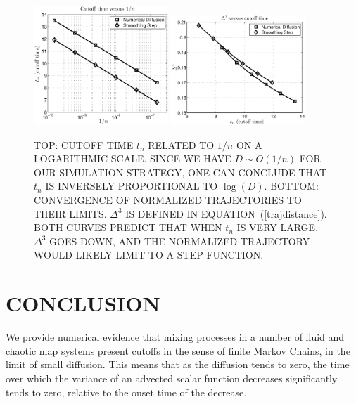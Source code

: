 \documentclass[twocolumn,10pt]{asme2e}
\begin{document}
\begin{figure}
   \label{cutofftime}
      \includegraphics[width=0.45\textwidth]{cutofftimevsD}
      \includegraphics[width=0.45\textwidth]{areavscutofftime}
     \caption{\label{cutofftimeandarea} TOP: CUTOFF TIME $t_n$ RELATED
       TO $1/n$ ON A LOGARITHMIC SCALE. SINCE WE HAVE $D \sim O(1/n)$
       FOR OUR SIMULATION STRATEGY, ONE CAN CONCLUDE THAT $t_n$ IS
       INVERSELY PROPORTIONAL TO $\log(D)$. BOTTOM: CONVERGENCE OF
       NORMALIZED TRAJECTORIES TO THEIR LIMITS. $\Delta^3$ IS DEFINED
       IN EQUATION~(\ref{trajdistance}). BOTH CURVES PREDICT THAT WHEN
       $t_n$ IS VERY LARGE, $\Delta^3$ GOES DOWN, AND THE NORMALIZED
       TRAJECTORY WOULD LIKELY LIMIT TO A STEP FUNCTION.}
\end{figure}








\section*{CONCLUSION}
We provide numerical evidence that mixing processes in a number of
fluid and chaotic map systems present cutoffs in the sense of finite
Markov Chains, in the limit of small diffusion. This means that as the
diffusion tends to zero, the time over which the variance of an
advected scalar function decreases significantly tends to zero,
relative to the onset time of the decrease.


\end{document}
